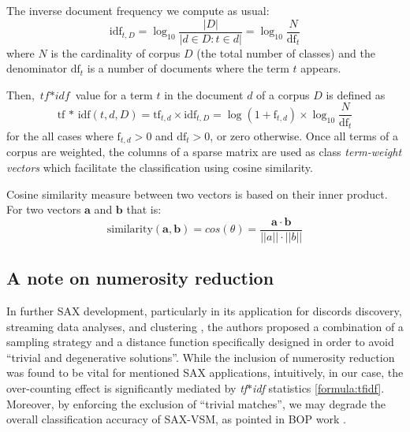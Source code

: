\documentclass{llncs}
\begin{document}
The inverse document frequency we compute as usual:
\begin{equation}
 \mbox{idf}_{t, D} =  \log_{10}\frac{|D|}{|d \in D : t \in d|} = \log_{10}\frac{N}{\mbox{df}_{t}}
\end{equation} 
where $N$ is the cardinality of corpus $D$ (the total number of classes) and the 
denominator $\mbox{df}_{t}$ is a number of documents where the term $t$ appears.

Then, $\textit{tf$\ast$idf}$ value for a term $t$ in the document $d$ of a corpus $D$ is defined as 
\begin{equation}
 \mbox{tf * idf}(t, d, D) =  \mbox{tf}_{t, d} \times \mbox{idf}_{t, D} = \log(1 + \mbox{f}_{t,d})
\times \log_{10}\frac{N}{\mbox{df}_{t}}
 \label{formula:tfidf}
\end{equation} 
for the all cases where $\mbox{f}_{t,d}>0$ and $\mbox{df}_{t}>0$, or zero otherwise.
Once all terms of a corpus are weighted, the columns of a sparse matrix are used 
as class \textit{term-weight vectors} which facilitate the classification using cosine similarity. 

\enlargethispage{0.5cm} 
Cosine similarity measure between two vectors is based on their inner product. 
For two vectors $\boldsymbol{a}$ and $\boldsymbol{b}$ that is:
\begin{equation}
\mbox{similarity}(\boldsymbol{a},\boldsymbol{b}) = cos(\theta) = \frac{ 
\mathbf{a} \cdot \mathbf{b} } {\left| \left| a \right| \right| \cdot \left| \left| b \right|
\right|}
\end{equation} 

\subsection{A note on numerosity reduction}
In further SAX development, particularly in its application for discords discovery,
streaming data analyses, and clustering \cite{hot_sax, streaming_sax}, the authors 
proposed a combination of a sampling strategy and a distance function specifically 
designed in order to avoid ``trivial and degenerative solutions''. While the inclusion of
numerosity reduction was found to be vital for mentioned SAX applications, intuitively, 
in our case, the over-counting effect is significantly mediated by \textit{tf$\ast$idf}
statistics \eqref{formula:tfidf}. Moreover, by enforcing the exclusion of ``trivial matches'', we
may degrade the overall classification accuracy of SAX-VSM, as pointed in 
BOP work \cite{bag_patterns}.
\end{document}
